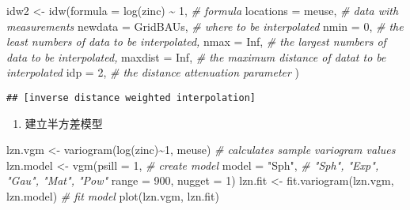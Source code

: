 \documentclass[
]{book}
\newenvironment{Shaded}{\begin{snugshade}}{\end{snugshade}}
\newcommand{\AttributeTok}[1]{\textcolor[rgb]{0.77,0.63,0.00}{#1}}
\newcommand{\CommentTok}[1]{\textcolor[rgb]{0.56,0.35,0.01}{\textit{#1}}}
\newcommand{\ConstantTok}[1]{\textcolor[rgb]{0.00,0.00,0.00}{#1}}
\newcommand{\DecValTok}[1]{\textcolor[rgb]{0.00,0.00,0.81}{#1}}
\newcommand{\FunctionTok}[1]{\textcolor[rgb]{0.00,0.00,0.00}{#1}}
\newcommand{\NormalTok}[1]{#1}
\newcommand{\OtherTok}[1]{\textcolor[rgb]{0.56,0.35,0.01}{#1}}
\newcommand{\SpecialCharTok}[1]{\textcolor[rgb]{0.00,0.00,0.00}{#1}}
\newcommand{\StringTok}[1]{\textcolor[rgb]{0.31,0.60,0.02}{#1}}
\providecommand{\tightlist}{%
  \setlength{\itemsep}{0pt}\setlength{\parskip}{0pt}}
\begin{document}
\begin{Shaded}
\begin{Highlighting}[]
\NormalTok{idw2 }\OtherTok{\textless{}{-}} \FunctionTok{idw}\NormalTok{(}\AttributeTok{formula =} \FunctionTok{log}\NormalTok{(zinc) }\SpecialCharTok{\textasciitilde{}} \DecValTok{1}\NormalTok{, }\CommentTok{\# formula}
         \AttributeTok{locations =}\NormalTok{ meuse, }\CommentTok{\# data with measurements}
         \AttributeTok{newdata =}\NormalTok{ GridBAUs, }\CommentTok{\# where to be interpolated}
         \AttributeTok{nmin =} \DecValTok{0}\NormalTok{, }\CommentTok{\# the least numbers of data to be interpolated,}
         \AttributeTok{nmax =} \ConstantTok{Inf}\NormalTok{, }\CommentTok{\# the largest numbers of data to be interpolated,}
         \AttributeTok{maxdist =} \ConstantTok{Inf}\NormalTok{, }\CommentTok{\# the maximum distance of datat to be interpolated}
         \AttributeTok{idp =} \DecValTok{2}\NormalTok{, }\CommentTok{\# the distance attenuation parameter}
\NormalTok{         ) }
\end{Highlighting}
\end{Shaded}

\begin{verbatim}
## [inverse distance weighted interpolation]
\end{verbatim}

\begin{enumerate}
\def\labelenumi{\arabic{enumi}.}
\setcounter{enumi}{3}
\tightlist
\item
  建立半方差模型
\end{enumerate}

\begin{Shaded}
\begin{Highlighting}[]
\NormalTok{lzn.vgm }\OtherTok{\textless{}{-}} \FunctionTok{variogram}\NormalTok{(}\FunctionTok{log}\NormalTok{(zinc)}\SpecialCharTok{\textasciitilde{}}\DecValTok{1}\NormalTok{, meuse) }\CommentTok{\# calculates sample variogram values}
\NormalTok{lzn.model }\OtherTok{\textless{}{-}} \FunctionTok{vgm}\NormalTok{(}\AttributeTok{psill =} \DecValTok{1}\NormalTok{, }\CommentTok{\# create model}
                 \AttributeTok{model =} \StringTok{"Sph"}\NormalTok{, }\CommentTok{\# "Sph", "Exp", "Gau", "Mat", "Pow"}
                 \AttributeTok{range =} \DecValTok{900}\NormalTok{, }
                 \AttributeTok{nugget =} \DecValTok{1}\NormalTok{)}
\NormalTok{lzn.fit }\OtherTok{\textless{}{-}} \FunctionTok{fit.variogram}\NormalTok{(lzn.vgm, lzn.model) }\CommentTok{\# fit model}
\FunctionTok{plot}\NormalTok{(lzn.vgm, lzn.fit)}
\end{Highlighting}
\end{Shaded}
\end{document}
